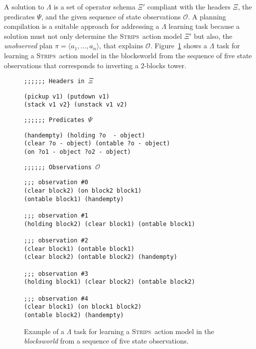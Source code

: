 \documentclass{article}
\newcommand{\tup}[1]{{\langle #1 \rangle}}
\newcommand{\strips}{\textsc{Strips}}     %
\begin{document}
A solution to $\Lambda$ is a set of operator schema $\Xi'$ compliant with the headers $\Xi$, the predicates $\Psi$, and the given sequence of state observations $\mathcal{O}$. A planning compilation is a suitable approach for addressing a $\Lambda$ learning task because a solution must not only determine the \strips\ action model $\Xi'$ but also, the {\em unobserved} plan $\pi=\tup{a_1, \ldots, a_n}$, that explains $\mathcal{O}$. Figure~\ref{fig:lexample} shows a $\Lambda$ task for learning a \strips\ action model in the blocksworld from the sequence of five state observations that corresponds to inverting a 2-blocks tower.

\begin{figure}
{\footnotesize\tt ;;;;;; Headers in $\Xi$}
\begin{footnotesize}
\begin{verbatim}
(pickup v1) (putdown v1)
(stack v1 v2} (unstack v1 v2)
\end{verbatim}
\end{footnotesize}
\vspace{0.2cm}
{\footnotesize\tt ;;;;;; Predicates $\Psi$}
\begin{footnotesize}
\begin{verbatim}
(handempty) (holding ?o  - object)
(clear ?o - object) (ontable ?o - object)
(on ?o1 - object ?o2 - object)
\end{verbatim}
\end{footnotesize}
\vspace{0.2cm}
{\footnotesize\tt ;;;;;; Observations $\mathcal{O}$}
\begin{footnotesize}
\begin{verbatim}
;;; observation #0
(clear block2) (on block2 block1)
(ontable block1) (handempty)

;;; observation #1
(holding block2) (clear block1) (ontable block1)

;;; observation #2
(clear block1) (ontable block1)
(clear block2) (ontable block2) (handempty)

;;; observation #3
(holding block1) (clear block2) (ontable block2)

;;; observation #4
(clear block1) (on block1 block2)
(ontable block2) (handempty)
\end{verbatim}
\end{footnotesize}
 \caption{\small Example of a $\Lambda$ task for learning a \strips\ action model in the {\em blocksworld} from a sequence of five state observations.}
\label{fig:lexample}
\end{figure}
\end{document}
